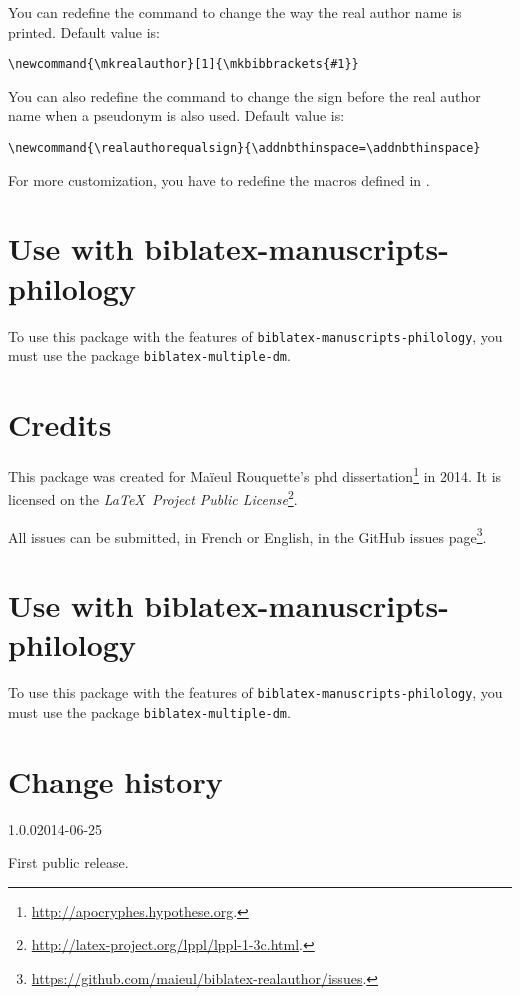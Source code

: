 \documentclass{ltxdockit}[2011/03/25]
\begin{document}
You can redefine the  command to change the way the real author name is printed. Default value is:

\begin{verbatim}
\newcommand{\mkrealauthor}[1]{\mkbibbrackets{#1}}
\end{verbatim}

You can also redefine the  command to change the sign before the real author name when a pseudonym is also used. Default value is:

\begin{verbatim}
\newcommand{\realauthorequalsign}{\addnbthinspace=\addnbthinspace}
\end{verbatim}

For more customization, you have to redefine the macros defined in .

\section{Use with biblatex-manuscripts-philology}

To use this package with the features of \verb+biblatex-manuscripts-philology+, you must use the package \verb+biblatex-multiple-dm+.

\section{Credits}

This package was created for Maïeul Rouquette's phd dissertation\footnote{\url{http://apocryphes.hypothese.org}.} in 2014. It is licensed on the \emph{\LaTeX\ Project Public License}\footnote{\url{http://latex-project.org/lppl/lppl-1-3c.html}.}.


All issues can be submitted, in French or English, in the GitHub issues page\footnote{\url{https://github.com/maieul/biblatex-realauthor/issues}.}.

\section{Use with biblatex-manuscripts-philology}

To use this package with the features of \verb+biblatex-manuscripts-philology+, you must use the package \verb+biblatex-multiple-dm+.

\section{Change history}

\begin{changelog}



\begin{release}{1.0.0}{2014-06-25}
\item First public release.
\end{release}
\end{changelog}
\end{document}
